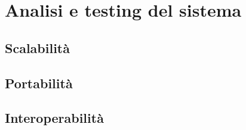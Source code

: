 \chapter{Analisi e testing del sistema}

\section{Scalabilità}

\section{Portabilità}

\section{Interoperabilità}

